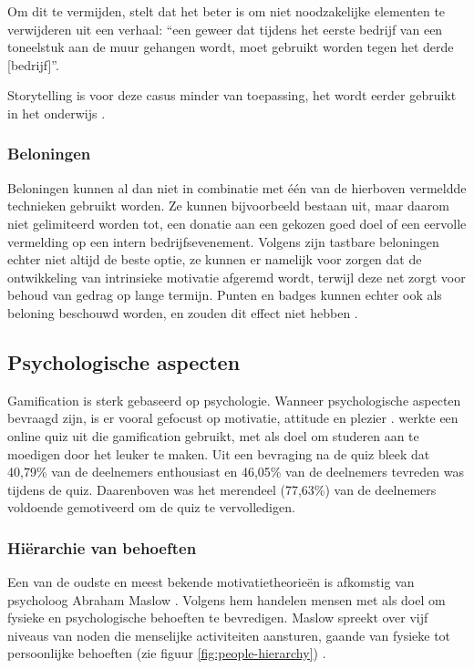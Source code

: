 Om dit te vermijden, stelt \textcite{Duster1990} dat het beter is om niet noodzakelijke elementen te verwijderen uit een verhaal: ``een geweer dat tijdens het eerste bedrijf van een toneelstuk aan de muur gehangen wordt, moet gebruikt worden tegen het derde [bedrijf]''.

Storytelling is voor deze casus minder van toepassing, het wordt eerder gebruikt in het onderwijs \autocite{Schmoelz2018}.

\subsubsection{Beloningen}
Beloningen kunnen al dan niet in combinatie met één van de hierboven vermeldde technieken gebruikt worden. Ze kunnen bijvoorbeeld bestaan uit, maar daarom niet gelimiteerd worden tot, een donatie aan een gekozen goed doel of een eervolle vermelding op een intern bedrijfsevenement.
Volgens \textcite{Lewis2016} zijn tastbare beloningen echter niet altijd de beste optie, ze kunnen er namelijk voor zorgen dat de ontwikkeling van intrinsieke motivatie afgeremd wordt, terwijl deze net zorgt voor behoud van gedrag op lange termijn. Punten en badges kunnen echter ook als beloning beschouwd worden, en zouden dit effect niet hebben \autocite{Lewis2016}.

\subsection{Psychologische aspecten}
Gamification is sterk gebaseerd op psychologie. Wanneer psychologische aspecten bevraagd zijn, is er vooral gefocust op motivatie, attitude en plezier \autocite{Hamari2014}. \textcite{Cheong2013} werkte een online quiz uit die gamification gebruikt, met als doel om studeren aan te moedigen door het leuker te maken. Uit een bevraging  na de quiz bleek dat 40,79\% van de deelnemers enthousiast en 46,05\% van de deelnemers tevreden was tijdens de quiz. Daarenboven was het merendeel (77,63\%) van de deelnemers voldoende gemotiveerd om de quiz te vervolledigen.

\subsubsection{Hiërarchie van behoeften}
Een van de oudste en meest bekende motivatietheorieën is afkomstig van psycholoog Abraham Maslow \autocite{Richter2014}. Volgens hem handelen mensen met als doel om fysieke en psychologische behoeften te bevredigen. Maslow spreekt over vijf niveaus van noden die menselijke activiteiten aansturen, gaande van fysieke tot persoonlijke behoeften (zie figuur \ref{fig:people-hierarchy}) \autocite{Lilienfeld2014}.


